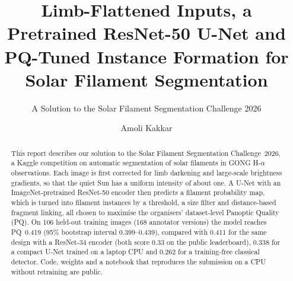 \documentclass[sigconf]{acmart}
\begin{document}
\title{Limb-Flattened Inputs, a Pretrained ResNet-50 U-Net and PQ-Tuned Instance Formation for Solar Filament Segmentation}
\subtitle{A Solution to the Solar Filament Segmentation Challenge 2026} %


\author{Amoli Kakkar}

\begin{abstract}
    This report describes our solution to the Solar Filament Segmentation Challenge~2026, a Kaggle competition on automatic segmentation of solar filaments in GONG H-$\alpha$ observations. Each image is first corrected for limb darkening and large-scale brightness gradients, so that the quiet Sun has a uniform intensity of about one. A U-Net with an ImageNet-pretrained ResNet-50 encoder then predicts a filament probability map, which is turned into filament instances by a threshold, a size filter and distance-based fragment linking, all chosen to maximise the organisers' dataset-level Panoptic Quality (PQ). On 106 held-out training images (168 annotator versions) the model reaches PQ~0.419 (95\% bootstrap interval 0.399--0.439), compared with 0.411 for the same design with a ResNet-34 encoder (both score 0.33 on the public leaderboard), 0.338 for a compact U-Net trained on a laptop CPU and 0.262 for a training-free classical detector. Code, weights and a notebook that reproduces the submission on a CPU without retraining are public.
\end{abstract}

\maketitle

\ifguideStyle
{}
\par\medskip
\fi


\end{document}

